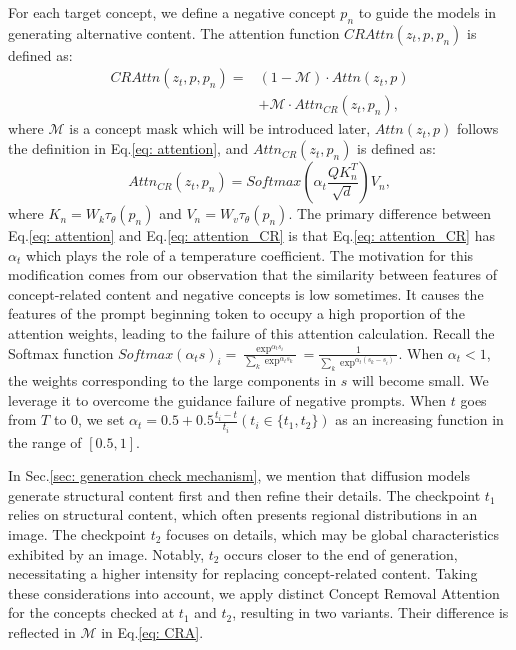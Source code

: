 For each target concept, we define a negative concept $p_n$ to guide the models in generating alternative content. The attention function $CRAttn(z_t, p, p_n)$ is defined as:
\begin{equation}
\label{eq: CRA}
\begin{split}
    CRAttn(z_t, p, p_n) = &
     (1-\mathcal{M})  \cdot Attn(z_t, p) \\ & +  \mathcal{M} \cdot Attn_{CR}(z_t, p_n),
\end{split}
\end{equation}
where $\mathcal{M}$ is a concept mask which will be introduced later, $Attn(z_t, p)$ follows the definition in Eq.\ref{eq: attention}, and $Attn_{CR}(z_t, p_n)$ is defined as:
\begin{equation}
\label{eq: attention_CR}
    Attn_{CR}(z_t, p_n) = Softmax(\alpha_t \frac{QK_n^T}{\sqrt{d}})V_n,
\end{equation}
where $K_n=W_k\tau_\theta(p_n)$ and $V_n=W_v\tau_\theta(p_n)$. The primary difference between Eq.\ref{eq: attention} and Eq.\ref{eq: attention_CR} is that Eq.\ref{eq: attention_CR} has $\alpha_t$ which plays the role of a temperature coefficient. The motivation for this modification comes from our observation that the similarity between features of concept-related content and negative concepts is low sometimes. It causes the features of the prompt beginning token to occupy a high proportion of the attention weights, leading to the failure of this attention calculation. Recall the Softmax function $Softmax(\alpha_ts)_i = \frac{\exp^{\alpha_ts_i}}{\sum_k\exp^{\alpha_ts_k}} = \frac{1}{\sum_k\exp^{\alpha_t(s_k-s_i)}}$. When $\alpha_t<1$, the weights corresponding to the large components in $s$ will become small. We leverage it to overcome the guidance failure of negative prompts. When $t$ goes from $T$ to $0$, we set $\alpha_t=0.5+0.5\frac{t_i-t}{t_i} (t_i\in \{t_1, t_2\})$ as an increasing function in the range of $[0.5, 1]$.


In Sec.\ref{sec: generation check mechanism}, we mention that diffusion models generate structural content first and then refine their details. The checkpoint $t_1$ relies on structural content, which often presents regional distributions in an image. The checkpoint $t_2$ focuses on details, which may be global characteristics exhibited by an image. Notably, $t_2$ occurs closer to the end of generation, necessitating a higher intensity for replacing concept-related content. Taking these considerations into account, we apply distinct Concept Removal Attention for the concepts checked at $t_1$ and $t_2$, resulting in two variants. Their difference is reflected in $\mathcal{M}$ in Eq.\ref{eq: CRA}.

